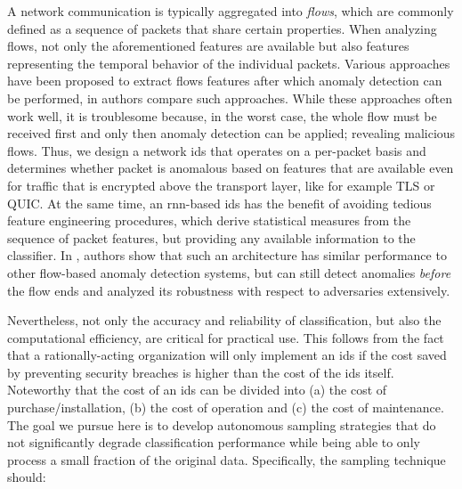 \documentclass[conference]{IEEEtran}
\begin{document}
A network communication is typically aggregated into \textit{flows}, which are commonly defined as a sequence of packets that share certain properties. When analyzing flows, not only the aforementioned features are available but also features representing the temporal behavior of the individual packets. Various approaches have been proposed to extract flows features after which anomaly detection can be performed, in \cite{meghdouri_analysis_2018} authors compare such approaches.
While these approaches often work well, it is troublesome because, in the worst case, the whole flow must be received first and only then anomaly detection can be applied; revealing malicious flows. Thus, we design a network \gls{ids} that operates on a per-packet basis and determines whether packet is anomalous based on features that are available even for traffic that is encrypted above the transport layer, like for example TLS or QUIC.
At the same time, an \gls{rnn}-based \gls{ids} has the benefit of avoiding tedious feature engineering procedures, which derive statistical measures from the sequence of packet features, but providing any available information to the classifier.
In \cite{hartl_explainability_2019}, authors show that such an architecture has similar performance to other flow-based anomaly detection systems, but can still detect anomalies \textit{before} the flow ends and analyzed its robustness with respect to adversaries extensively.


Nevertheless, not only the accuracy and reliability of classification, but also the computational efficiency, are critical for practical use. This follows from the fact that a rationally-acting organization will only implement an \gls{ids} if the cost saved by preventing security breaches is higher than the cost of the \gls{ids} itself. Noteworthy that the cost of an \gls{ids} can be divided into (a) the cost of purchase/installation, (b) the cost of operation and (c) the cost of maintenance.  The goal we pursue here is to develop autonomous sampling strategies that do not significantly degrade classification performance while being able to only process a small fraction of the original data. Specifically, the sampling technique should:
\end{document}
